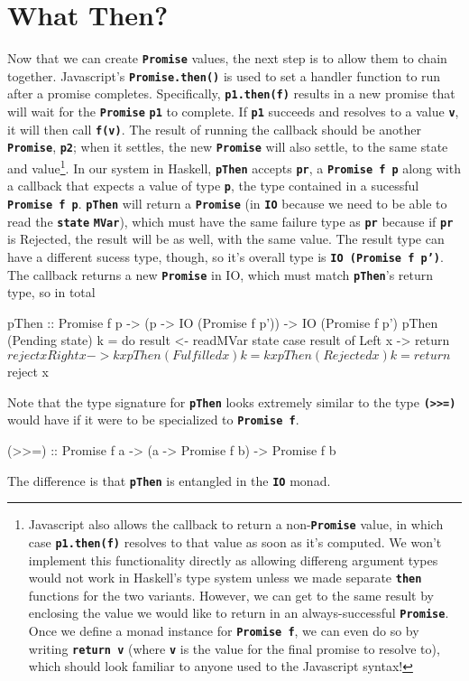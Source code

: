 \documentclass[12pt, english, letterpaper]{kuthesis}
\newcommand{\lit}[1]{\textbf{\texttt{#1}}}
\begin{document}
\section*{What Then?}
Now that we can create \lit{Promise} values, the next step is to allow them to chain together.  Javascript's \lit{Promise.then()} is used to set a handler function to run after a promise completes.  Specifically, \lit{p1.then(f)} results in a new promise that will wait for the \lit{Promise} \lit{p1} to complete.  If \lit{p1} succeeds and resolves to a value \lit v, it will then call \lit{f(v)}.  The result of running the callback should be another \lit{Promise}, \lit{p2}; when it settles, the new \lit{Promise} will also settle, to the same state and value\footnote{Javascript also allows the callback to return a non-\lit{Promise} value, in which case \lit{p1.then(f)} resolves to that value as soon as it's computed.  We won't implement this functionality directly
as allowing differeng argument types would not work in Haskell's type system unless we made separate \lit{then} functions for the two variants.  However, we can get to the same result by enclosing the value we would like to return in an always-successful \lit{Promise}.  Once we define a monad instance for \lit{Promise f}, we can even do so by writing \lit{return v} (where \lit{v} is the value for the final promise to resolve to), which should look familiar to anyone used to the Javascript syntax!}.
In our system in Haskell, \lit{pThen} accepts \lit{pr}, a \lit{Promise f p} along with a callback that expects a value of type \lit p, the type contained in a sucessful \lit{Promise f p}.  \lit{pThen} will return a \lit{Promise} (in \lit{IO} because we need to be able to read the \lit{state} \lit{MVar}), which must have the same failure type as \lit{pr} because if \lit{pr} is Rejected, the result will be as well, with the same value.  The result type can have a different sucess type, though, so it's overall type is \lit{IO (Promise f p')}.  The callback returns a new \lit{Promise} in IO, which must match \lit{pThen}'s return type, so in total
\begin{code}
pThen :: Promise f p
        -> (p -> IO (Promise f p'))
        -> IO (Promise f p')
pThen (Pending state) k = do
  result <- readMVar state
  case result of
    Left x -> return $ reject x
    Right x -> k x
pThen (Fulfilled x) k = k x
pThen (Rejected x) k = return $ reject x
\end{code}
      
Note that the type signature for \lit{pThen} looks extremely similar to the type \lit{(>>=)} would have if it were to be specialized to \lit{Promise f}.
\begin{code}
(>>=) :: Promise f a -> (a -> Promise f b) -> Promise f b
\end{code}
The difference is that \lit{pThen} is entangled in the \lit{IO} monad.
\end{document}
